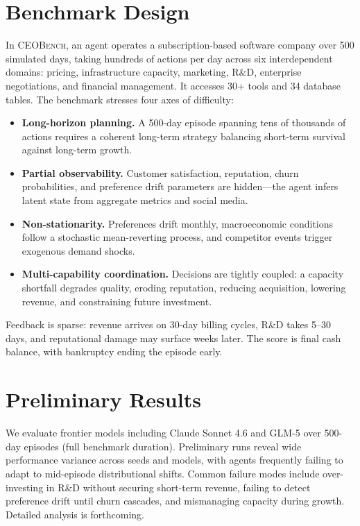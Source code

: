 \documentclass[10pt,letterpaper,twocolumn]{article}
\begin{document}
\section{Benchmark Design}

In \textsc{CEOBench}, an agent operates a subscription-based software company over 500 simulated days, taking hundreds of actions per day across six interdependent domains: pricing, infrastructure capacity, marketing, R\&D, enterprise negotiations, and financial management. It accesses 30+ tools and 34 database tables. The benchmark stresses four axes of difficulty:
\begin{itemize}
  \item \textbf{Long-horizon planning.} A 500-day episode spanning tens of thousands of actions requires a coherent long-term strategy balancing short-term survival against long-term growth.
  \item \textbf{Partial observability.} Customer satisfaction, reputation, churn probabilities, and preference drift parameters are hidden---the agent infers latent state from aggregate metrics and social media.
  \item \textbf{Non-stationarity.} Preferences drift monthly, macroeconomic conditions follow a stochastic mean-reverting process, and competitor events trigger exogenous demand shocks.
  \item \textbf{Multi-capability coordination.} Decisions are tightly coupled: a capacity shortfall degrades quality, eroding reputation, reducing acquisition, lowering revenue, and constraining future investment.
\end{itemize}

\vspace{-3pt}
Feedback is sparse: revenue arrives on 30-day billing cycles, R\&D takes 5--30 days, and reputational damage may surface weeks later. The score is final cash balance, with bankruptcy ending the episode early.

\section{Preliminary Results}

We evaluate frontier models including Claude Sonnet 4.6 and GLM-5 over 500-day episodes (full benchmark duration). Preliminary runs reveal wide performance variance across seeds and models, with agents frequently failing to adapt to mid-episode distributional shifts. Common failure modes include over-investing in R\&D without securing short-term revenue, failing to detect preference drift until churn cascades, and mismanaging capacity during growth. Detailed analysis is forthcoming.
\end{document}
